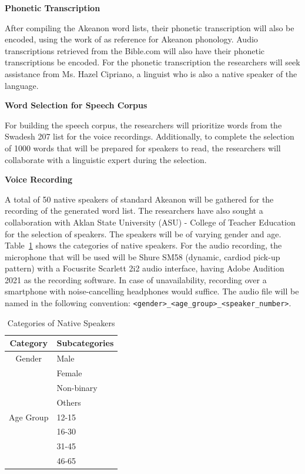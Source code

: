 \textbf{Phonetic Transcription}

After compiling the Akeanon word lists, their phonetic transcription will also be encoded, using the work of  as reference for Akeanon phonology. Audio transcriptions retrieved from the Bible.com will also have their phonetic transcriptions be encoded. For the phonetic transcription the researchers will seek assistance from Ms. Hazel Cipriano, a linguist who is also a native speaker of the language.

\textbf{Word Selection for Speech Corpus}

For building the speech corpus, the researchers will prioritize words from the Swadesh 207 list for the voice recordings. Additionally, to complete the selection of 1000 words that will be prepared for speakers to read, the researchers will collaborate with a linguistic expert during the selection.

\textbf{Voice Recording}

A total of 50 native speakers of standard Akeanon will be gathered for the recording of the generated word list. The researchers have also sought a collaboration with Aklan State University (ASU) - College of Teacher Education for the selection of speakers. The speakers will be of varying gender and age. Table~\ref{tab:native_speakers} shows the categories of native speakers. For the audio recording, the microphone that will be used will be Shure SM58 (dynamic, cardiod pick-up pattern) with a Focusrite Scarlett 2i2 audio interface, having Adobe Audition 2021 as the recording software. In case of unavailability, recording over a smartphone with noise-cancelling headphones would suffice. The audio file will be named in the following convention: \texttt{\textless gender\textgreater\_\textless age\_group\textgreater\_\textless speaker\_number\textgreater}.

\begin{table}[ht]
   \centering
   \caption{Categories of Native Speakers} \vspace{0.25em}
   \label{tab:native_speakers}
\begin{tabular}{|c|p{2in}|} \hline
   \centering Category & Subcategories \\ \hline
   Gender & Male \\
   & Female \\
   & Non-binary \\
   & Others \\ \hline
   Age Group & 12-15 \\
   & 16-30 \\
   & 31-45 \\
   & 46-65 \\ \hline
\end{tabular}
\end{table}

